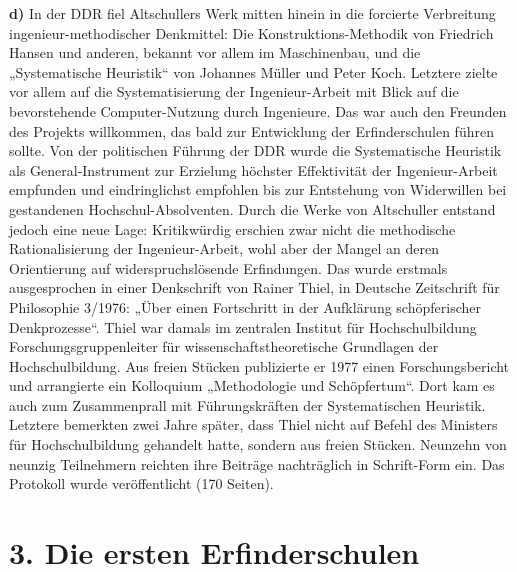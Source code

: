 \documentclass[12pt,a4paper]{article}
\begin{document}
\textbf{d)} 
In der DDR fiel Altschullers Werk mitten hinein in die forcierte Verbreitung
ingenieur-methodischer Denkmittel: Die Konstruktions-Methodik von Friedrich
Hansen und anderen, bekannt vor allem im Maschinenbau, und die „Systematische
Heuristik“ von Johannes Müller und Peter Koch. Letztere zielte vor allem auf
die Systematisierung der Ingenieur-Arbeit mit Blick auf die bevorstehende
Computer-Nutzung durch Ingenieure. Das war auch den Freunden des Projekts
willkommen, das bald zur Entwicklung der Erfinderschulen führen sollte. Von der
politischen Führung der DDR wurde die Systematische Heuristik als
General-Instrument zur Erzielung höchster Effektivität der Ingenieur-Arbeit
empfunden und eindringlichst empfohlen bis zur Entstehung von Widerwillen bei
gestandenen Hochschul-Absolventen. Durch die Werke von Altschuller entstand
jedoch eine neue Lage: Kritikwürdig erschien zwar nicht die methodische
Rationalisierung der Ingenieur-Arbeit, wohl aber der Mangel an deren
Orientierung auf widerspruchslösende Erfindungen. Das wurde erstmals
ausgesprochen in einer Denkschrift von Rainer Thiel, in Deutsche Zeitschrift
für Philosophie 3/1976: „Über einen Fortschritt in der Aufklärung
schöpferischer Denkprozesse“. Thiel war damals im zentralen Institut für
Hochschulbildung Forschungsgruppenleiter für wissenschaftstheoretische
Grundlagen der Hochschulbildung. Aus freien Stücken publizierte er 1977 einen
Forschungsbericht und arrangierte ein Kolloquium „Methodologie und
Schöpfertum“. Dort kam es auch zum Zusammenprall mit Führungskräften der
Systematischen Heuristik.  Letztere bemerkten zwei Jahre später, dass Thiel
nicht auf Befehl des Ministers für Hochschulbildung gehandelt hatte, sondern
aus freien Stücken. Neunzehn von neunzig Teilnehmern reichten ihre Beiträge
nachträglich in Schrift-Form ein. Das Protokoll wurde veröffentlicht (170
Seiten).

\section*{3. Die ersten Erfinderschulen}
\end{document}
